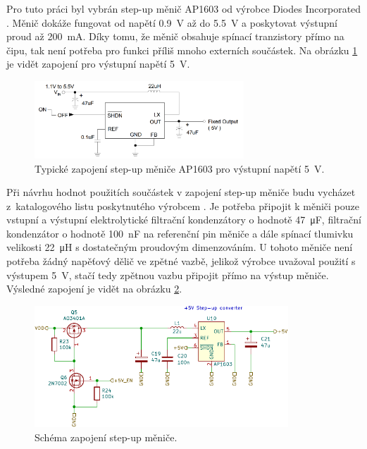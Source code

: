 Pro tuto práci byl vybrán step-up měnič AP1603 od výrobce Diodes Incorporated \cite{dat_AP1603}. Měnič dokáže fungovat od napětí \SI{0.9}{\volt} až do \SI{5.5}{\volt} a poskytovat výstupní proud až \SI{200}{\milli\ampere}. Díky tomu, že měnič obsahuje spínací tranzistory přímo na čipu, tak není potřeba pro funkci příliš mnoho externích součástek. Na obrázku \ref{fig_schematic-AP1603} je vidět zapojení pro výstupní napětí \SI{5}{\volt}. 

\begin{figure}[h]
    \centering
    \includegraphics[width=0.7\textwidth]{obrazky/schematicAP1603.png}
    \caption{Typické zapojení step-up měniče AP1603 pro výstupní napětí \SI{5}{\volt}. \cite{dat_AP1603}}
    \label{fig_schematic-AP1603}
\end{figure}

Při návrhu hodnot použitích součástek v zapojení step-up měniče budu vycházet z~katalogového listu poskytnutého výrobcem \cite{dat_AP1603}. Je potřeba připojit k měniči pouze vstupní a výstupní elektrolytické filtrační kondenzátory o hodnotě \SI{47}{\micro\farad}, filtrační kondenzátor o hodnotě \SI{100}{\nano\farad} na referenční pin měniče a dále spínací tlumivku velikosti \SI{22}{\micro\henry} s dostatečným proudovým dimenzováním. U tohoto měniče není potřeba žádný napěťový dělič ve zpětné vazbě, jelikož výrobce uvažoval použití s výstupem \SI{5}{\volt}, stačí tedy zpětnou vazbu připojit přímo na výstup měniče. Výsledné zapojení je vidět na obrázku \ref{fig_StepUp-kicad}.

\begin{figure}
    \centering
    \includegraphics[width=0.85\textwidth]{obrazky/stepup_schematic.pdf}
    \caption{Schéma zapojení step-up měniče.}
    \label{fig_StepUp-kicad}
\end{figure}


